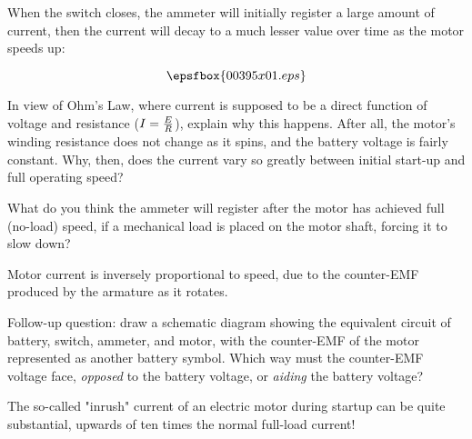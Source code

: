 

When the switch closes, the ammeter will initially register a large amount of current, then the current will decay to a much lesser value over time as the motor speeds up:

$$\epsfbox{00395x01.eps}$$

In view of Ohm's Law, where current is supposed to be a direct function of voltage and resistance ($I = {E \over R}$), explain why this happens.  After all, the motor's winding resistance does not change as it spins, and the battery voltage is fairly constant.  Why, then, does the current vary so greatly between initial start-up and full operating speed?

What do you think the ammeter will register after the motor has achieved full (no-load) speed, if a mechanical load is placed on the motor shaft, forcing it to slow down?







Motor current is inversely proportional to speed, due to the counter-EMF produced by the armature as it rotates.

\vskip 10pt

Follow-up question: draw a schematic diagram showing the equivalent circuit of battery, switch, ammeter, and motor, with the counter-EMF of the motor represented as another battery symbol.  Which way must the counter-EMF voltage face, {\it opposed} to the battery voltage, or {\it aiding} the battery voltage?







The so-called "inrush" current of an electric motor during startup can be quite substantial, upwards of ten times the normal full-load current!





